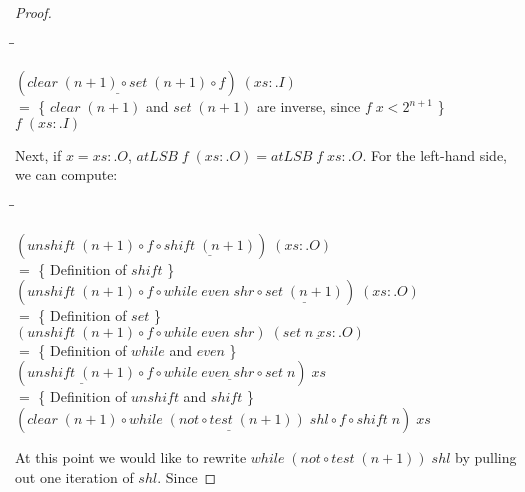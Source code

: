 \documentclass{jfp}
\newcommand{\Conid}[1]{\mathit{#1}}
\newcommand{\Varid}[1]{\mathit{#1}}
\newenvironment{sproof}{%
    \begin{tabbing}
    \phantom{$\equiv$} \= \qquad\qquad\qquad\qquad\qquad \= \kill
}{
    \end{tabbing}
}
\newcommand{\stmt}[1]{\> \ensuremath{#1} \\}
\newcommand{\reason}[2]{\ensuremath{#1} \>\> \{ \quad #2 \quad \} \\}
\theoremstyle{definition}
\theoremstyle{remark}
\begin{document}
\begin{proof}
\begin{sproof}
    \stmt{\ensuremath{(\underline{\Varid{clear}\;(\Varid{n}\mathbin{+}\mathrm{1})\mathbin{\circ}\Varid{set}\;(\Varid{n}\mathbin{+}\mathrm{1})}\mathbin{\circ}\Varid{f})\;(\Varid{xs}\mathrel{:\!.}\Conid{I})}}
    \reason{=}{\ensuremath{\Varid{clear}\;(\Varid{n}\mathbin{+}\mathrm{1})} and \ensuremath{\Varid{set}\;(\Varid{n}\mathbin{+}\mathrm{1})} are inverse, since $\ensuremath{\Varid{f}\;\Varid{x}} < 2^{n+1}$}
    \stmt{\ensuremath{\Varid{f}\;(\Varid{xs}\mathrel{:\!.}\Conid{I})}}
  \end{sproof}
  Next, if \ensuremath{\Varid{x}\mathrel{=}\Varid{xs}\mathrel{:\!.}\Conid{O}}, \ensuremath{\Varid{atLSB}\;\Varid{f}\;(\Varid{xs}\mathrel{:\!.}\Conid{O})\mathrel{=}\Varid{atLSB}\;\Varid{f}\;\Varid{xs}\mathrel{:\!.}\Conid{O}}.  For
  the left-hand side, we can compute:
  \begin{sproof}
    \stmt{\ensuremath{(\Varid{unshift}\;(\Varid{n}\mathbin{+}\mathrm{1})\mathbin{\circ}\Varid{f}\mathbin{\circ}\underline{\Varid{shift}\;(\Varid{n}\mathbin{+}\mathrm{1})})\;(\Varid{xs}\mathrel{:\!.}\Conid{O})}}
    \reason{=}{Definition of \ensuremath{\Varid{shift}}}
    \stmt{\ensuremath{(\Varid{unshift}\;(\Varid{n}\mathbin{+}\mathrm{1})\mathbin{\circ}\Varid{f}\mathbin{\circ}\Varid{while}\;\Varid{even}\;\Varid{shr}\mathbin{\circ}\underline{\Varid{set}\;(\Varid{n}\mathbin{+}\mathrm{1})})\;(\Varid{xs}\mathrel{:\!.}\Conid{O})}}
    \reason{=}{Definition of \ensuremath{\Varid{set}}}
    \stmt{\ensuremath{(\Varid{unshift}\;(\Varid{n}\mathbin{+}\mathrm{1})\mathbin{\circ}\Varid{f}\mathbin{\circ}\Varid{while}\;\Varid{even}\;\Varid{shr})\;(\underline{\Varid{set}\;\Varid{n}\;\Varid{xs}\mathrel{:\!.}\Conid{O}})}}
    \reason{=}{Definition of \ensuremath{\Varid{while}} and \ensuremath{\Varid{even}}}
    \stmt{\ensuremath{(\underline{\Varid{unshift}\;(\Varid{n}\mathbin{+}\mathrm{1})}\mathbin{\circ}\Varid{f}\mathbin{\circ}\underline{\Varid{while}\;\Varid{even}\;\Varid{shr}\mathbin{\circ}\Varid{set}\;\Varid{n}})\;\Varid{xs}}}
    \reason{=}{Definition of \ensuremath{\Varid{unshift}} and \ensuremath{\Varid{shift}}}
    \stmt{\ensuremath{(\Varid{clear}\;(\Varid{n}\mathbin{+}\mathrm{1})\mathbin{\circ}\underline{\Varid{while}\;(not\mathbin{\circ}\Varid{test}\;(\Varid{n}\mathbin{+}\mathrm{1}))\;\Varid{shl}}\mathbin{\circ}\Varid{f}\mathbin{\circ}\Varid{shift}\;\Varid{n})\;\Varid{xs}}}
  \end{sproof}
  At this point we would like to rewrite \ensuremath{\Varid{while}\;(not\mathbin{\circ}\Varid{test}\;(\Varid{n}\mathbin{+}\mathrm{1}))\;\Varid{shl}} by pulling out one iteration of \ensuremath{\Varid{shl}}. Since

\end{proof}
\end{document}
